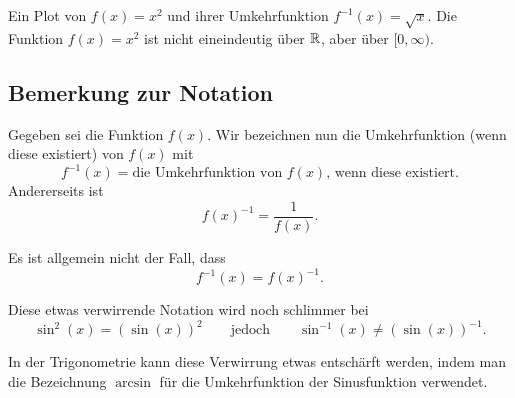 \begin{marginfigure}[0in]
\caption{Ein Plot von $f(x)=x^2$ und ihrer Umkehrfunktion $f^{-1}(x) = \sqrt{x}$. Die Funktion
  $f(x)=x^2$ ist nicht eineindeutig über $\mathbb{R}$, aber über $[0,\infty)$.}
\label{plot:fxn and inverse x^2}
\end{marginfigure}


\subsection{Bemerkung zur Notation}

Gegeben sei die Funktion $f(x)$. Wir bezeichnen nun die Umkehrfunktion (wenn diese existiert) von $f(x)$ mit
\[
f^{-1}(x) = \text{die Umkehrfunktion von $f(x)$, wenn diese existiert.}
\]
Andererseits ist
\[
f(x)^{-1} = \frac{1}{f(x)}.
\]

\begin{warning}
Es ist allgemein nicht der Fall, dass
\[
f^{-1}(x) = f(x)^{-1}.
\]
\end{warning}

Diese etwas verwirrende Notation wird noch schlimmer bei
\[
\sin^2(x) = (\sin(x))^2\qquad \text{jedoch} \qquad \sin^{-1}(x)
\ne(\sin(x))^{-1}.
\]

In der Trigonometrie kann diese Verwirrung etwas entschärft werden, indem man die Bezeichnung $\arcsin$ für die Umkehrfunktion der Sinusfunktion verwendet.




